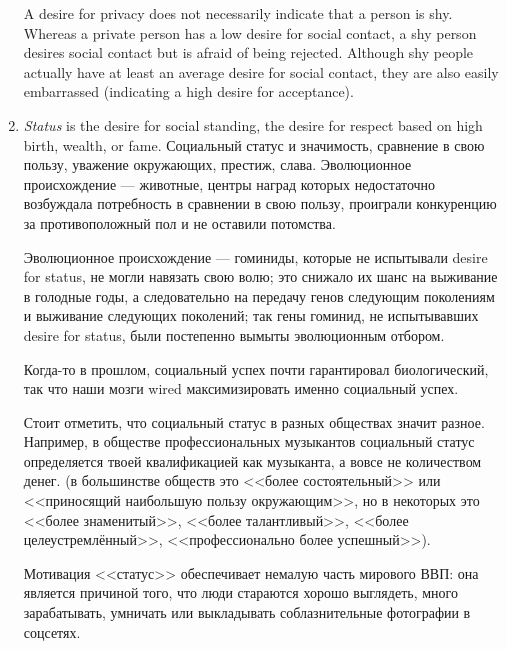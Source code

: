 \documentclass[11pt]{article}
\theoremstyle{remark}
\theoremstyle{definition}
\begin{document}
\begin{enumerate}
A desire for privacy does not necessarily indicate that a person is shy. Whereas a private person has a low desire for social contact, a shy person desires social contact but is afraid of being rejected. Although shy people actually have at least an average desire for social contact, they are also easily embarrassed (indicating a high desire for acceptance).



\item \textit{Status} is the desire for social standing, the desire for respect based on high birth, wealth, or fame. Социальный статус и значимость, сравнение в свою пользу, уважение окружающих, престиж, слава. Эволюционное происхождение --- животные, центры наград которых недостаточно возбуждала потребность в сравнении в свою пользу, проиграли конкуренцию за противоположный пол и не оставили потомства. 

Эволюционное происхождение --- гоминиды, которые не испытывали desire for status, не могли навязать свою волю; это снижало их шанс на выживание в голодные годы, а следовательно на передачу генов следующим поколениям и выживание следующих поколений; так гены гоминид, не испытывавших desire for status, были постепенно вымыты эволюционным отбором. 



Когда-то в прошлом, социальный успех почти гарантировал биологический, так что наши мозги wired максимизировать именно социальный успех. 

Стоит отметить, что социальный статус в разных обществах значит разное. Например, в обществе профессиональных музыкантов социальный статус определяется твоей квалификацией как музыканта, а вовсе не количеством денег. (в большинстве обществ это <<более состоятельный>> или <<приносящий наибольшую пользу окружающим>>, но в некоторых это <<более знаменитый>>, <<более талантливый>>, <<более целеустремлённый>>, <<профессионально более успешный>>). %

Мотивация <<статус>> обеспечивает немалую часть мирового ВВП: она является причиной того, что люди стараются хорошо выглядеть, много зарабатывать, умничать или выкладывать соблазнительные фотографии в соцсетях. 



\end{enumerate}
\end{document}
